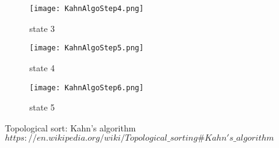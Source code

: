 \documentclass[12pt]{article}
\begin{document}
\begin{figure}[H]
\centering
\texttt{[image: KahnAlgoStep4.png]}
\caption{state 3}
\end{figure}
    
    
    \begin{figure}[H]
\centering
\texttt{[image: KahnAlgoStep5.png]}
\caption{state 4 }
\end{figure}

\begin{figure}[H]
\centering
\texttt{[image: KahnAlgoStep6.png]}
\caption{state 5}
\end{figure}
    
    


\begin{thebibliography}{1}
Topological sort: Kahn's algorithm
\\\texttt{$https://en.wikipedia.org/wiki/Topological\_sorting\#Kahn's\_algorithm$}

\end{thebibliography}
\end{document}
